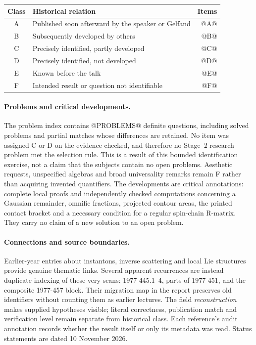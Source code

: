\begin{center}
\begin{tabular}{cl r}
\toprule
Class & Historical relation & Items\\
\midrule
A & Published soon afterward by the speaker or Gelfand & @A@\\
B & Subsequently developed by others & @B@\\
C & Precisely identified, partly developed & @C@\\
D & Precisely identified, not developed & @D@\\
E & Known before the talk & @E@\\
F & Intended result or question not identifiable & @F@\\
\bottomrule
\end{tabular}
\end{center}

\paragraph{Problems and critical developments.}
The problem index contains @PROBLEMS@ definite questions, including solved
problems and partial matches whose differences are retained. No item was
assigned C or D on the evidence checked, and therefore no Stage~2 research
problem met the selection rule. This is a result of this bounded
identification exercise, not a claim that the subjects contain no open
problems. Aesthetic requests, unspecified algebras and broad universality
remarks remain F rather than acquiring invented quantifiers.
The developments are critical annotations: complete local proofs and
independently checked computations concerning a Gaussian remainder,
omnific fractions, projected contour areas, the printed contact bracket
and a necessary condition for a regular spin-chain R-matrix. They carry
no claim of a new solution to an open problem.

\paragraph{Connections and source boundaries.}
Earlier-year entries about instantons, inverse scattering and local Lie
structures provide genuine thematic links. Several apparent recurrences
are instead duplicate indexing of these very scans: 1977-445.1--4,
parts of 1977-451, and the composite 1977-457 block. Their migration map
in the report preserves old identifiers without counting them as earlier
lectures. The field \emph{reconstruction} makes supplied hypotheses
visible; literal correctness, publication match and verification level
remain separate from historical class. Each reference's audit annotation
records whether the result itself or only its metadata was read. Status
statements are dated 10 November 2026.
